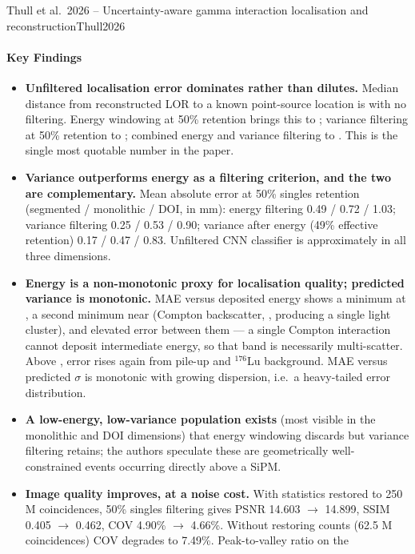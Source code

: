 \begin{papernote}{Thull et al.\ 2026 -- Uncertainty-aware gamma interaction localisation and reconstruction}{Thull2026}
\paragraph{Key Findings}
\begin{itemize}
    \item \textbf{Unfiltered localisation error dominates rather than dilutes.} Median
        distance from reconstructed LOR to a known point-source location is
        \textbf{} with no filtering. Energy windowing at 50\% retention brings this
        to ; variance filtering at 50\% retention to ; combined energy and
        variance filtering to \textbf{}. This is the single most quotable number
        in the paper.
    \item \textbf{Variance outperforms energy as a filtering criterion, and the two are
        complementary.} Mean absolute error at 50\% singles retention (segmented /
        monolithic / DOI, in mm): energy filtering 0.49 / 0.72 / 1.03; variance filtering
        0.25 / 0.53 / 0.90; variance after energy (49\% effective retention)
        0.17 / 0.47 / 0.83. Unfiltered CNN classifier is approximately  in all three
        dimensions.
    \item \textbf{Energy is a non-monotonic proxy for localisation quality; predicted
        variance is monotonic.} MAE versus deposited energy shows a minimum at , a
        second minimum near  (Compton backscatter, , producing a single
        light cluster), and elevated error between them --- a single Compton interaction
        cannot deposit intermediate energy, so that band is necessarily multi-scatter.
        Above , error rises again from pile-up and $^{176}$Lu background. MAE versus
        predicted $\sigma$ is monotonic with growing dispersion, i.e.\ a heavy-tailed error
        distribution.
    \item \textbf{A low-energy, low-variance population exists} (most visible in the
        monolithic and DOI dimensions) that energy windowing discards but variance
        filtering retains; the authors speculate these are geometrically well-constrained
        events occurring directly above a SiPM.
    \item \textbf{Image quality improves, at a noise cost.} With statistics restored to
        250 M coincidences, 50\% singles filtering gives PSNR 14.603 $\to$ 14.899,
        SSIM 0.405 $\to$ 0.462, COV 4.90\% $\to$ 4.66\%. Without restoring counts
        (62.5 M coincidences) COV degrades to 7.49\%. Peak-to-valley ratio on the 

\end{itemize}
\end{papernote}
